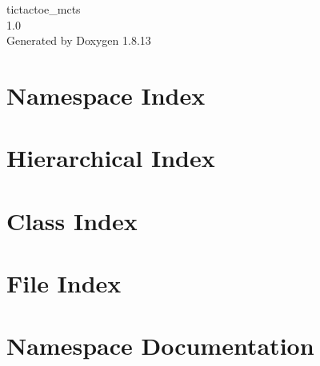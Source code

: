 \documentclass[twoside]{book}
\newcommand{\+}{\discretionary{\mbox{\scriptsize$\hookleftarrow$}}{}{}}
\newcommand{\clearemptydoublepage}{%
  \newpage{\pagestyle{empty}\cleardoublepage}%
}
\begin{document}
\hypersetup{pageanchor=false,
             bookmarksnumbered=true,
             pdfencoding=unicode
            }
\begin{titlepage}
\vspace*{7cm}
\begin{center}%
{\Large tictactoe\+\_\+mcts \\[1ex]\large 1.\+0 }\\
\vspace*{1cm}
{\large Generated by Doxygen 1.8.13}\\
\end{center}
\end{titlepage}
\clearemptydoublepage
{}
\tableofcontents
\clearemptydoublepage
{}
\hypersetup{pageanchor=true}

\chapter{Namespace Index}

\chapter{Hierarchical Index}

\chapter{Class Index}

\chapter{File Index}

\chapter{Namespace Documentation}








\end{document}
